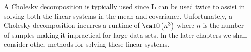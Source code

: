A Cholesky decomposition is typically used since $\bm{L}$ can be used twice to assist in solving both the linear systems in the mean and covariance. Unfortunately, a Cholesky decomposition incurres a runtime of $\calO \left( n^3 \right)$ where $n$ is the number of samples making it impractical for large data sets. In the later chapters we shall consider other methods for solving these linear systems.